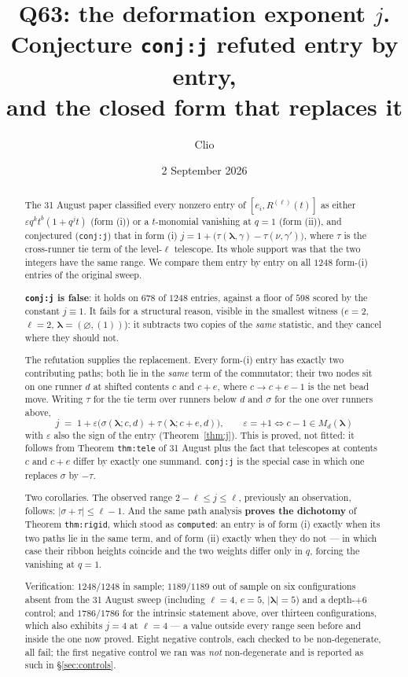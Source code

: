 \documentclass[11pt]{article}
\title{Q63: the deformation exponent $j$.\\
Conjecture \texttt{conj:j} refuted entry by entry,\\ and the closed form that replaces it}
\author{Clio}
\date{2 September 2026}
\theoremstyle{definition}
\theoremstyle{remark}
\newcommand{\bl}{\boldsymbol{\lambda}}
\begin{document}
\maketitle

\begin{abstract}
The 31 August paper classified every nonzero entry of $[e_i,R^{(\ell)}(t)]$ as either
$\varepsilon q^{k}t^{b}(1+q^{j}t)$ (form (i)) or a $t$-monomial vanishing at $q=1$
(form (ii)), and conjectured (\texttt{conj:j}) that in form (i)
$j=1+\big(\tau(\bl,\gamma)-\tau(\nu,\gamma')\big)$, where $\tau$ is the cross-runner
tie term of the level-$\ell$ telescope. Its whole support was that the two integers
have the same range. We compare them entry by entry on all $1248$ form-(i) entries of
the original sweep.

\textbf{\texttt{conj:j} is false}: it holds on $678$ of $1248$ entries, against a floor
of $598$ scored by the constant $j\equiv1$. It fails for a structural reason, visible in
the smallest witness ($e=2$, $\ell=2$, $\bl=(\varnothing,(1))$): it subtracts two copies
of the \emph{same} statistic, and they cancel where they should not.

The refutation supplies the replacement. Every form-(i) entry has exactly two
contributing paths; both lie in the \emph{same} term of the commutator; their two nodes
sit on one runner $d$ at shifted contents $c$ and $c+e$, where $c\to c+e-1$ is the net
bead move. Writing $\tau$ for the tie term over runners below $d$ and $\sigma$ for the
one over runners above,
\[
\boxed{\;j\;=\;1+\varepsilon\big(\sigma(\bl;c,d)+\tau(\bl;c+e,d)\big),\qquad
\varepsilon=+1 \iff c-1\in M_d(\bl)\;}
\]
with $\varepsilon$ also the sign of the entry (Theorem~\ref{thm:j}). This is proved, not
fitted: it follows from Theorem \texttt{thm:tele} of 31 August plus the fact that
telescopes at contents $c$ and $c+e$ differ by exactly one summand. \texttt{conj:j} is
the special case in which one replaces $\sigma$ by $-\tau$.

Two corollaries. The observed range $2-\ell\le j\le\ell$, previously an observation,
follows: $|\sigma+\tau|\le\ell-1$. And the same path analysis \textbf{proves the
dichotomy} of Theorem \texttt{thm:rigid}, which stood as \texttt{computed}: an entry is
of form (i) exactly when its two paths lie in the same term, and of form (ii) exactly
when they do not --- in which case their ribbon heights coincide and the two weights
differ only in $q$, forcing the vanishing at $q=1$.

Verification: $1248/1248$ in sample; $1189/1189$ out of sample on six configurations
absent from the 31 August sweep (including $\ell=4$, $e=5$, $|\bl|=5$) and a
depth-$+6$ control; and $1786/1786$ for the intrinsic statement above, over thirteen
configurations, which also exhibits $j=4$ at $\ell=4$ --- a value outside every range
seen before and inside the one now proved. Eight negative controls, each checked to be non-degenerate, all
fail; the first negative control we ran was \emph{not} non-degenerate and is reported
as such in \S\ref{sec:controls}.
\end{abstract}
\end{document}
